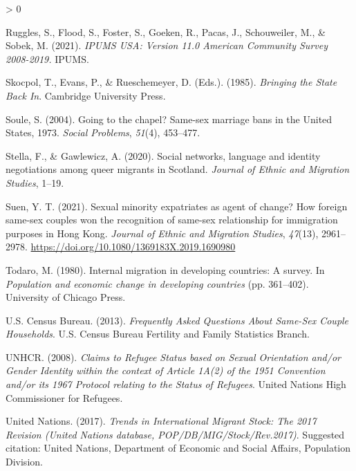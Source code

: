\documentclass[
  11pt,
]{article}
\newlength{\cslhangindent}
\newenvironment{CSLReferences}[2] %
 {%
  \setlength{\parindent}{0pt}
  \ifodd #1 \everypar{\setlength{\hangindent}{\cslhangindent}}\ignorespaces\fi
  \ifnum #2 > 0
  \setlength{\parskip}{#2\baselineskip}
  \fi
 }%
 {}
\begin{document}
\begin{CSLReferences}{1}{0}
\leavevmode\hypertarget{ref-ruggles_2021}{}%
Ruggles, S., Flood, S., Foster, S., Goeken, R., Pacas, J., Schouweiler, M., \& Sobek, M. (2021). \emph{{IPUMS USA}: {Version} 11.0 {American Community Survey} 2008-2019.} {IPUMS}.

\leavevmode\hypertarget{ref-skocpol_1985}{}%
Skocpol, T., Evans, P., \& Rueschemeyer, D. (Eds.). (1985). \emph{Bringing the {State Back In}}. {Cambridge University Press}.

\leavevmode\hypertarget{ref-soule_2004}{}%
Soule, S. (2004). Going to the chapel? {Same}-sex marriage bans in the {United States}, 1973{}. \emph{Social Problems}, \emph{51}(4), 453--477.

\leavevmode\hypertarget{ref-stella_2020}{}%
Stella, F., \& Gawlewicz, A. (2020). Social networks, language and identity negotiations among queer migrants in {Scotland}. \emph{Journal of Ethnic and Migration Studies}, 1--19.

\leavevmode\hypertarget{ref-suen_2021_sexual}{}%
Suen, Y. T. (2021). Sexual minority expatriates as agent of change? {How} foreign same-sex couples won the recognition of same-sex relationship for immigration purposes in {Hong Kong}. \emph{Journal of Ethnic and Migration Studies}, \emph{47}(13), 2961--2978. \url{https://doi.org/10.1080/1369183X.2019.1690980}

\leavevmode\hypertarget{ref-todaro_1980}{}%
Todaro, M. (1980). Internal migration in developing countries: A survey. In \emph{Population and economic change in developing countries} (pp. 361--402). {University of Chicago Press}.

\leavevmode\hypertarget{ref-u.s.censusbureau_2013}{}%
U.S. Census Bureau. (2013). \emph{Frequently {Asked Questions About Same}-{Sex Couple Households}}. {U.S. Census Bureau Fertility and Family Statistics Branch}.

\leavevmode\hypertarget{ref-unhcr_2008}{}%
UNHCR. (2008). \emph{Claims to {Refugee Status} based on {Sexual Orientation} and/or {Gender Identity} within the context of {Article 1A}(2) of the 1951 {Convention} and/or its 1967 {Protocol} relating to the {Status} of {Refugees}}. {United Nations High Commissioner for Refugees}.

\leavevmode\hypertarget{ref-unitednations_2017}{}%
United Nations. (2017). \emph{Trends in {International Migrant Stock}: {The} 2017 {Revision} ({United Nations} database, {POP}/{DB}/{MIG}/{Stock}/{Rev}.2017)}. {Suggested citation: United Nations, Department of Economic and Social Affairs, Population Division}.


\end{CSLReferences}
\end{document}
